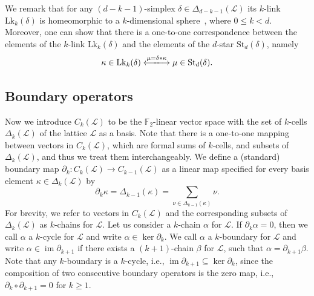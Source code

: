 \documentclass[onecolumn,letterpaper,11pt,accepted=2022-12-19]{quantumarticle}
\newcommand{\face}[2]{{\Delta_{#1}(#2)}}
\newcommand{\link}[2]{{\mathrm{Lk}_{#1}(#2)}}
\renewcommand{\star}[2]{{\mathrm{St}_{#1}(#2)}}
\DeclareMathOperator{\im}{im}
\theoremstyle{definition}
\theoremstyle{lemma}
\theoremstyle{theorem}
\theoremstyle{corollary}
\begin{document}
We remark that for any $(d-k-1)$-simplex $\delta\in\face {d-k-1}{\mathcal{L}}$ its $k$-link $\link k \delta$ is homeomorphic to a $k$-dimensional sphere~\cite{Glaser1972}, where $0\leq k < d$.
Moreover, one can show that there is a one-to-one correspondence between the elements of the $k$-link $\link k \delta$ and the elements of the $d$-star $\star d \delta$, namely
\begin{equation}
\label{eq_link_star}
\kappa\in\link{k}{\delta} 
\xlongleftrightarrow{\mu = \delta * \kappa}
\mu\in\star{d}{\delta}.
\end{equation}


\subsection{Boundary operators}


Now we introduce $C_k(\mathcal L)$ to be the $\mathbb{F}_2$-linear vector space with the set of $k$-cells $\face{k}{\mathcal{L}}$ of the lattice $\mathcal{L}$ as a basis. 
Note that there is a one-to-one mapping between vectors in $C_k(\mathcal L)$, which are formal sums of $k$-cells, and subsets of $\face{k}{\mathcal{L}}$, and thus we treat them interchangeably.
We define a (standard) boundary map $\partial_k: C_k(\mathcal L) \rightarrow C_{k-1}(\mathcal L)$ as a linear map specified for every basis element $\kappa \in \face k {\mathcal L}$ by
\begin{equation}
\partial_{k} \kappa = \face {k-1} \kappa = \sum_{\nu \in \face{k-1}\kappa} \nu.
\label{eq_bnd_standard}
\end{equation}
For brevity, we refer to vectors in $C_k(\mathcal L)$ and the corresponding subsets of $\face k {\mathcal{L}}$ as $k$-chains for $\mathcal{L}$.
Let us consider a $k$-chain $\alpha$ for $\mathcal{L}$.
If $\partial_k \alpha = 0$, then we call $\alpha$ a $k$-cycle for $\mathcal{L}$ and write $\alpha\in\ker\partial_k$.
We call $\alpha$ a $k$-boundary for $\mathcal{L}$ and write $\alpha\in\im\partial_{k+1}$ if there exists a $(k+1)$-chain $\beta$ for $\mathcal{L}$, such that $\alpha = \partial_{k+1}\beta$.
Note that any $k$-boundary is a $k$-cycle, i.e., $\im\partial_{k+1} \subseteq \ker\partial_k$, since the composition of two consecutive boundary operators is the zero map, i.e., $\partial_{k}\circ \partial_{k+1} = 0$ for $k\geq 1$. 
\end{document}
